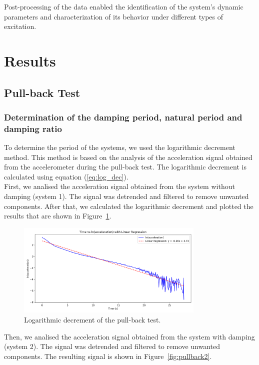 \documentclass{article}  %
\begin{document}
Post-processing of the data enabled the identification of the system’s dynamic parameters and characterization of its behavior under different types of excitation.

\newpage
\section{Results}
 
\subsection{Pull-back Test}
\subsubsection{Determination of the damping period, natural period and damping ratio}
To determine the period of the systems, we used the logarithmic decrement method. This method is based on the analysis of the acceleration signal obtained from the accelerometer during the pull-back test. The logarithmic decrement is calculated using equation (\ref{eq:log_dec}).\\
First, we analised the acceleration signal obtained from the system without damping (system 1). The signal was detrended and filtered to remove unwanted components. After that, we calculated the logarithmic decrement and plotted the results that are shown in Figure~\ref{fig:pullback1}.



\begin{figure}[h]
  \centering
  \includegraphics[width=0.8\textwidth]{GRAFICOS/regresion_lineal_first.png}
  \caption{Logarithmic decrement of the pull-back test.}
  \label{fig:pullback1}  
\end{figure}

Then, we analised the acceleration signal obtained from the system with damping (system 2). The signal was detrended and filtered to remove unwanted components. The resulting signal is shown in Figure~\ref{fig:pullback2}.
\end{document}
